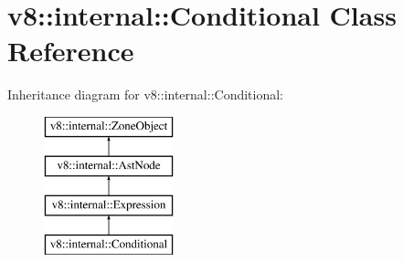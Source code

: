 \hypertarget{classv8_1_1internal_1_1_conditional}{}\section{v8\+:\+:internal\+:\+:Conditional Class Reference}
\label{classv8_1_1internal_1_1_conditional}
Inheritance diagram for v8\+:\+:internal\+:\+:Conditional\+:\begin{figure}[H]
\begin{center}
\leavevmode
\includegraphics[height=4.000000cm]{classv8_1_1internal_1_1_conditional}
\end{center}
\end{figure}
